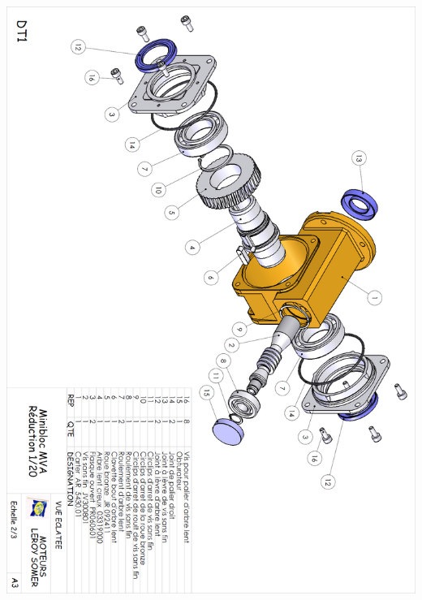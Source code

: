 \documentclass[10pt,fleqn]{article} %
\begin{document}
\begin{center}
\includegraphics[width=\textwidth]{images/reducteur_02}
\end{center}
\end{document}
